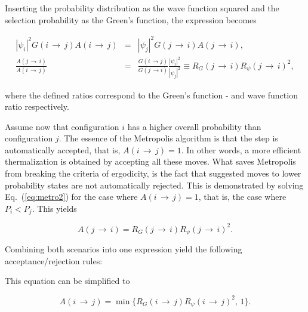 Inserting the probability distribution as the wave function squared and the selection probability as the Green's function, the expression becomes

\begin{eqnarray}
  \label{eq:metro2}
  |\psi_i|^2G(i\,\rightarrow\,j)A(i\,\rightarrow\,j) &=& |\psi_j|^2G(j\,\rightarrow\,i)A(j\,\rightarrow\,i), \nonumber \\
  \frac{A(j\,\rightarrow\,i)}{A(i\,\rightarrow\,j)} &=& \frac{G(i\,\rightarrow j)}{G(j\,\rightarrow i)}\frac{|\psi_i|^2}{|\psi_j|^2} \equiv R_G(j\,\rightarrow\,i)R_\psi(j\,\rightarrow\,i)^2,
\end{eqnarray}

where the defined ratios correspond to the Green's function - and wave function ratio respectively. 

Assume now that configuration $i$ has a higher overall probability than configuration $j$. The essence of the Metropolis algorithm is that the step is automatically accepted, that is, $A(i\,\rightarrow\,j) = 1$. In other words, a more efficient thermalization is obtained by accepting all these moves. What saves Metropolis from breaking the criteria of ergodicity, is the fact that suggested moves to lower probability states are not automatically rejected. This is demonstrated by solving Eq.~(\ref{eq:metro2}) for the case where $A(i\,\rightarrow\,j) = 1$, that is, the case where $P_i < P_j$. This yields

\begin{equation*}
 A(j\,\rightarrow\,i) = R_G(j\,\rightarrow\,i)R_\psi(j\,\rightarrow\,i)^2.
\end{equation*}


Combining both scenarios into one expression yield the following acceptance/rejection rules:


This equation can be simplified to

\begin{equation}
  A(i\,\rightarrow\,j) = \min\{R_G(i\,\rightarrow\,j)R_\psi(i\,\rightarrow\,j)^2, \,1\}.
\end{equation}


